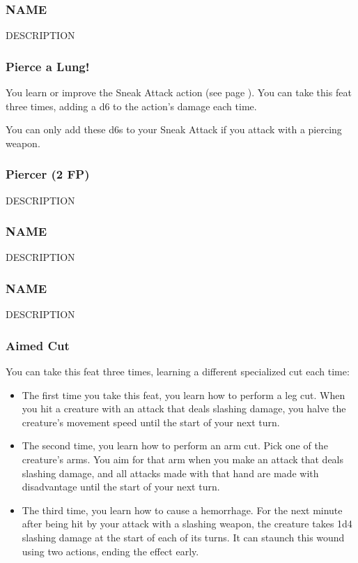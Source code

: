 \subsubsection{NAME} \label{feat::name}
    DESCRIPTION
\subsubsection{Pierce a Lung!} \label{feat::piercealung}
    You learn or improve the Sneak Attack action (see page \pageref{act:sneakattack}).
    You can take this feat three times, adding a d6 to the action's damage each time.

    You can only add these d6s to your Sneak Attack if you attack with a piercing weapon.
\subsubsection{Piercer (2 FP)} \label{feat::piercer}
    DESCRIPTION
\subsubsection{NAME} \label{feat::name}
    DESCRIPTION
\subsubsection{NAME} \label{feat::name}
    DESCRIPTION
\subsubsection{Aimed Cut} \label{feat::aimedcut}
    You can take this feat three times, learning a different specialized cut each time:
    \begin{itemize}
        \item The first time you take this feat, you learn how to perform a leg cut.
        When you hit a creature with an attack that deals slashing damage, you halve the creature's movement speed until the start of your next turn.
        \item The second time, you learn how to perform an arm cut.
        Pick one of the creature's arms.
        You aim for that arm when you make an attack that deals slashing damage, and all attacks made with that hand are made with disadvantage until the start of your next turn.
        \item The third time, you learn how to cause a hemorrhage.
        For the next minute after being hit by your attack with a slashing weapon, the creature takes 1d4 slashing damage at the start of each of its turns.
        It can staunch this wound using two actions, ending the effect early.
    \end{itemize}

